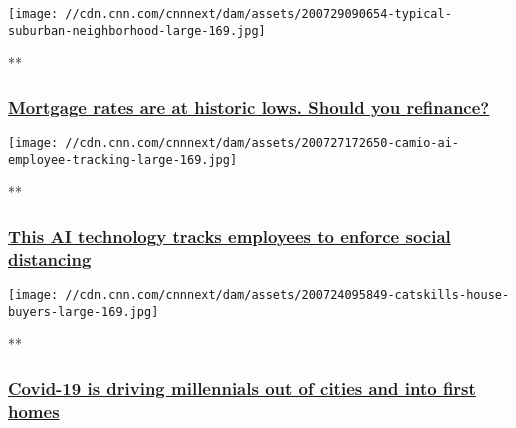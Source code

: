 \href{/videos/business/2020/07/29/mortgage-rates-romans-gr-orig.cnn/video/playlists/business-news/}{}

\texttt{[image: //cdn.cnn.com/cnnnext/dam/assets/200729090654-typical-suburban-neighborhood-large-169.jpg]}

**

\hypertarget{mortgage-rates-are-at-historic-lows-should-you-refinance-}{%
\subsubsection{\texorpdfstring{\href{/videos/business/2020/07/29/mortgage-rates-romans-gr-orig.cnn/video/playlists/business-news/}{Mortgage
rates are at historic lows. Should you refinance?
}}{Mortgage rates are at historic lows. Should you refinance? }}\label{mortgage-rates-are-at-historic-lows-should-you-refinance-}}

\href{/videos/business/2020/07/27/ai-employee-tracking-technology-coronavirus-orig.cnn-business/video/playlists/business-news/}{}

\texttt{[image: //cdn.cnn.com/cnnnext/dam/assets/200727172650-camio-ai-employee-tracking-large-169.jpg]}

**

\hypertarget{this-ai-technology-tracks-employees-to-enforce-social-distancing}{%
\subsubsection{\texorpdfstring{\href{/videos/business/2020/07/27/ai-employee-tracking-technology-coronavirus-orig.cnn-business/video/playlists/business-news/}{This
AI technology tracks employees to enforce social
distancing}}{This AI technology tracks employees to enforce social distancing}}\label{this-ai-technology-tracks-employees-to-enforce-social-distancing}}

\href{/videos/business/2020/07/24/new-york-city-urban-exodus-housing-real-estate-suburb-connecticut-catskills-orig.cnn-business/video/playlists/business-news/}{}

\texttt{[image: //cdn.cnn.com/cnnnext/dam/assets/200724095849-catskills-house-buyers-large-169.jpg]}

**

\hypertarget{covid-19-is-driving-millennials-out-of-cities-and-into-first-homes}{%
\subsubsection{\texorpdfstring{\href{/videos/business/2020/07/24/new-york-city-urban-exodus-housing-real-estate-suburb-connecticut-catskills-orig.cnn-business/video/playlists/business-news/}{Covid-19
is driving millennials out of cities and into first
homes}}{Covid-19 is driving millennials out of cities and into first homes}}\label{covid-19-is-driving-millennials-out-of-cities-and-into-first-homes}}

